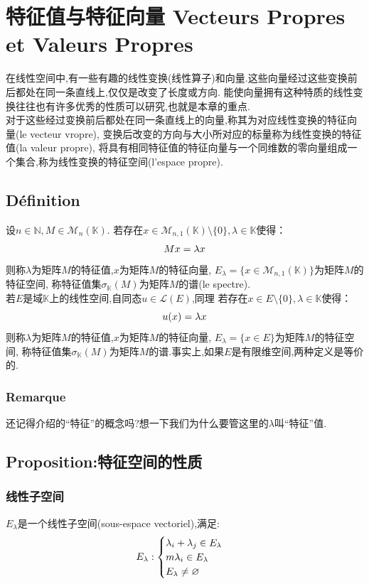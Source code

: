 \documentclass[12pt, a4paper, oneside]{ctexbook}
\begin{document}
\section{特征值与特征向量 Vecteurs Propres et Valeurs Propres}
  在线性空间中,有一些有趣的线性变换(线性算子)和向量.这些向量经过这些变换前后都处在同一条直线上,仅仅是改变了长度或方向.
  能使向量拥有这种特质的线性变换往往也有许多优秀的性质可以研究,也就是本章的重点.\\
  
  对于这些经过变换前后都处在同一条直线上的向量,称其为对应线性变换的特征向量(le vecteur vropre),
  变换后改变的方向与大小所对应的标量称为线性变换的特征值(la valeur propre),
  将具有相同特征值的特征向量与一个同维数的零向量组成一个集合,称为线性变换的特征空间(l'espace propre).
  \subsection{Définition}
  设$n\in\mathbb{N} , M\in \mathcal{M}_n(\mathbb{K})$.
  若存在$x\in \mathcal{M}_{n,1}(\mathbb{K})\setminus\{0\}, \lambda\in\mathbb{K}$使得：
  \begin{equation}
    \notag
    Mx=\lambda x
  \end{equation}
  则称$\lambda$为矩阵$M$的特征值,$x$为矩阵$M$的特征向量,
  $E_\lambda=\{x\in\mathcal{M}_{n,1}(\mathbb{K})\}$为矩阵$M$的特征空间,
  称特征值集$\sigma_{\mathbb{K}}(M)$为矩阵$M$的谱(le spectre).\\

  若$E$是域$\mathbb{K}$上的线性空间,自同态$u\in \mathcal{L} (E)$,同理
  若存在$x\in E\setminus\{0\}, \lambda\in\mathbb{K}$使得：
  \begin{equation}
    \notag
    u(x)=\lambda x
  \end{equation}
  则称$\lambda$为矩阵$M$的特征值,$x$为矩阵$M$的特征向量,
  $E_\lambda=\{x\in E\}$为矩阵$M$的特征空间,
  称特征值集$\sigma_{\mathbb{K}}(M)$为矩阵$M$的谱.事实上,如果$E$是有限维空间,两种定义是等价的.
  \subsubsection{Remarque}
  还记得介绍的“特征”的概念吗?想一下我们为什么要管这里的$\lambda$叫“特征”值.
  \subsection{Proposition:特征空间的性质}
  \subsubsection{线性子空间}
  $E_\lambda$是一个线性子空间(sous-espace vectoriel),满足:
  \begin{equation}
    \notag
    E_\lambda:
    \begin{cases}
    \lambda_i+\lambda_j\in E_\lambda \\
    m\lambda_i\in E_\lambda \\
    E_\lambda\neq \varnothing 
    \end{cases}
  \end{equation}
\end{document}
